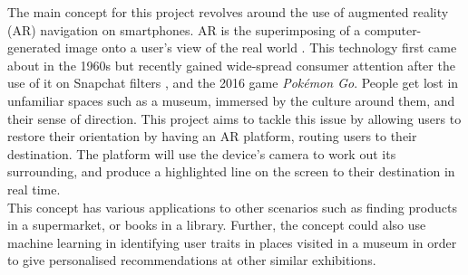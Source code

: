 
The main concept for this project revolves around the use of augmented reality (AR) navigation on smartphones. AR is the superimposing of a computer-generated image onto a user's view of the real world \cite{oxforddict}. This technology first came about in the 1960s \cite{InteractionDesign} but recently gained wide-spread consumer attention after the use of it on Snapchat filters \cite{Snapchat}, and the 2016 game \textit{Pokémon Go}. People get lost in unfamiliar spaces such as a museum, immersed by the culture around them, and their sense of direction. This project aims to tackle this issue by allowing users to restore their orientation by having an AR platform, routing users to their destination. The platform will use the device's camera to work out its surrounding, and produce a highlighted line on the screen to their destination in real time.\\

This concept has various applications to other scenarios such as finding products in a supermarket, or books in a library. Further, the concept could also use machine learning in identifying user traits in places visited in a museum in order to give personalised recommendations at other similar exhibitions.